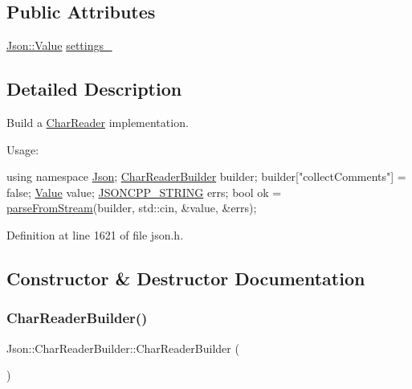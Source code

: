 \subsection*{Public Attributes}
\begin{DoxyCompactItemize}
\item 
\hyperlink{class_json_1_1_value}{Json\+::\+Value} \hyperlink{class_json_1_1_char_reader_builder_ac69b7911ad64c171c51ebaf2ea26d958}{settings\+\_\+}
\end{DoxyCompactItemize}


\subsection{Detailed Description}
Build a \hyperlink{class_json_1_1_char_reader}{Char\+Reader} implementation. 

Usage\+: 
\begin{DoxyCode}
\textcolor{keyword}{using namespace }\hyperlink{namespace_json}{Json};
\hyperlink{class_json_1_1_char_reader_builder}{CharReaderBuilder} builder;
builder[\textcolor{stringliteral}{"collectComments"}] = \textcolor{keyword}{false};
\hyperlink{class_json_1_1_value}{Value} value;
\hyperlink{json_8h_a1e723f95759de062585bc4a8fd3fa4be}{JSONCPP\_STRING} errs;
\textcolor{keywordtype}{bool} ok = \hyperlink{namespace_json_aab0cf1ecf81d1aeca12be2a416a84352}{parseFromStream}(builder, std::cin, &value, &errs);
\end{DoxyCode}
 

Definition at line 1621 of file json.\+h.



\subsection{Constructor \& Destructor Documentation}
\mbox{\label{class_json_1_1_char_reader_builder_a6e197b69a2ede3d87b03b9c5c78ba46a}} 
\subsubsection{\texorpdfstring{Char\+Reader\+Builder()}{CharReaderBuilder()}}
{\footnotesize\ttfamily Json\+::\+Char\+Reader\+Builder\+::\+Char\+Reader\+Builder (\begin{DoxyParamCaption}{ }\end{DoxyParamCaption})}



